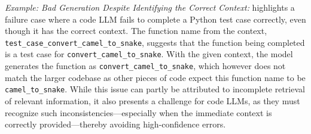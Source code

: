 \begin{tcolorbox}[colback=lightblue, boxrule=0pt, arc=5pt, outer arc=5pt, after skip=10pt plus 2pt]
\textit{Example: Bad Generation Despite Identifying the Correct Context:} \citet{ding2023crosscodeeval} highlights a failure case where a code LLM fails to complete a Python test case correctly, even though it has the correct context. The function name from the context, \texttt{test\_case\_convert\_camel\_to\_snake}, suggests that the function being completed is a test case for \texttt{convert\_camel\_to\_snake}. With the given context, the model generates the function as \texttt{convert\_camel\_to\_snake}, which however does not match the larger codebase as other pieces of code expect this function name to be \texttt{camel\_to\_snake}. While this issue can partly be attributed to incomplete retrieval of relevant information, it also presents a challenge for code LLMs, as they must recognize such inconsistencies—especially when the immediate context is correctly provided—thereby avoiding high-confidence errors.
\end{tcolorbox}





